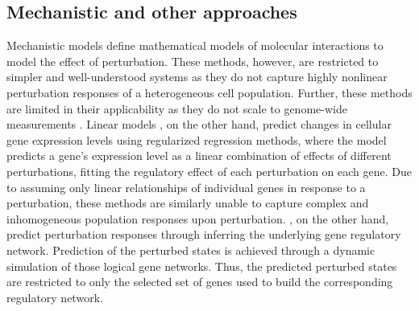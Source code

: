 \subsection{Mechanistic and other approaches}
Mechanistic models \citep{yuan2021, frohlich2018} define mathematical models of molecular interactions to model the effect of perturbation.
These methods, however, are restricted to simpler and well-understood systems as they do not capture highly nonlinear perturbation responses of a heterogeneous cell population. Further, these methods are limited in their applicability as they do not scale to genome-wide measurements \citep{snijder2012, berchtold2018, green2016}.
Linear models \citep{dixit2016, kamimoto2023}, on the other hand,  predict changes in cellular gene expression levels using regularized regression methods, where the model predicts a gene's expression level as a linear combination of effects of different perturbations, fitting the regulatory effect of each perturbation on each gene.
Due to assuming only linear relationships of individual genes in response to a perturbation, these methods are similarly  unable to capture complex and inhomogeneous population responses upon perturbation.
\citet{heydari2022}, on the other hand, predict perturbation responses through inferring the underlying gene regulatory network. Prediction of the perturbed states is achieved through a dynamic simulation of those logical gene networks. Thus, the predicted perturbed states are restricted to only the selected set of genes used to build the corresponding regulatory network.


